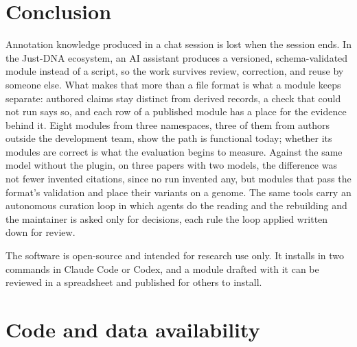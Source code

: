 \documentclass[11pt,a4paper]{article}
\begin{document}
\section{Conclusion}

Annotation knowledge produced in a chat session is lost when the session ends.
In the Just-DNA ecosystem, an AI assistant produces a versioned,
schema-validated module instead of a script, so the work survives review,
correction, and reuse by someone else. What makes that more than a file format
is what a module keeps separate: authored claims stay distinct from derived
records, a check that
could not run says so, and each row of a published module has a place for
the evidence behind it. Eight modules from three namespaces, three of them from authors
outside the development team, show the path is functional today; whether its
modules are correct is what the evaluation begins to measure. Against the same
model without the plugin, on three papers with two models, the difference was
not fewer invented citations, since no run invented any, but modules that pass
the format's validation and place their variants on a genome. The same
tools carry an autonomous curation loop in which agents do the reading and the
rebuilding and the maintainer is asked only for decisions, each rule the loop
applied written down for review.

The software is open-source and intended for research use only. It installs
in two commands in Claude Code or Codex, and a module drafted with it can be
reviewed in a spreadsheet and published for others to install.

\section{Code and data availability}
\label{sec:code}
\end{document}
